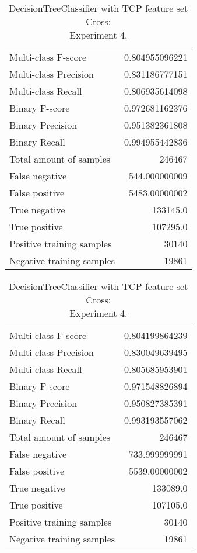 \begin{table}[H]
\begin{minipage}{0.5\textwidth}
\caption{DecisionTreeClassifier with TCP feature set Cross: \\Experiment 3.}
\centering
\begin{tabular}{l r}
\toprule
Multi-class F-score & 0.804955096221 \\
Multi-class Precision & 0.831186777151 \\
Multi-class Recall & 0.806935614098 \\
\midrule
Binary F-score & 0.972681162376 \\
Binary Precision & 0.951382361808 \\
Binary Recall & 0.994955442836 \\
\midrule
Total amount of samples & 246467 \\
False negative & 544.000000009 \\
False positive & 5483.00000002 \\
True negative & 133145.0 \\
True positive & 107295.0 \\
\midrule
Positive training samples & 30140 \\
Negative training samples & 19861 \\
\bottomrule
\end{tabular}
\end{minipage}
\hfillx
\begin{minipage}{0.5\textwidth}
\caption{DecisionTreeClassifier with TCP feature set Cross: \\Experiment 4.}
\centering
\begin{tabular}{l r}
\toprule
Multi-class F-score & 0.804199864239 \\
Multi-class Precision & 0.830049639495 \\
Multi-class Recall & 0.805685953901 \\
\midrule
Binary F-score & 0.971548826894 \\
Binary Precision & 0.950827385391 \\
Binary Recall & 0.993193557062 \\
\midrule
Total amount of samples & 246467 \\
False negative & 733.999999991 \\
False positive & 5539.00000002 \\
True negative & 133089.0 \\
True positive & 107105.0 \\
\midrule
Positive training samples & 30140 \\
Negative training samples & 19861 \\
\bottomrule
\end{tabular}
\end{minipage}
\end{table}
